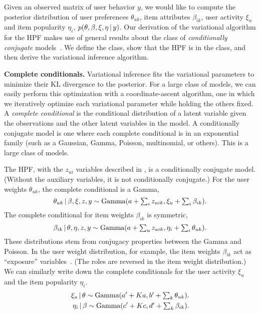 Given an observed matrix of user behavior $y$, we would like to
compute the posterior distribution of user preferences $\theta_{uk}$,
item attributes $\beta_{ik}$, user activity $\xi_u$ and item
popularity $\eta_i$, $p(\theta, \beta, \xi, \eta \,\vert\, y)$.  Our
derivation of the variational algorithm for the HPF makes use of
general results about the class of \textit{conditionally conjugate}
models~\cite{Ghahramani:2001,Hoffman:2013}.  We define the class, show
that the HPF is in the class, and then derive the variational
inference algorithm.

{\bf Complete conditionals.}  Variational inference fits the
variational parameters to minimize their KL divergence to the
posterior. For a large class of models, we can easily perform this
optimization with a coordinate-ascent algorithm, one in which we
iteratively optimize each variational parameter while holding the
others fixed.  A \textit{complete conditional} is the conditional
distribution of a latent variable given the observations and the other
latent variables in the model.  A conditionally conjugate model is one
where each complete conditional is in an exponential family (such as a
Gaussian, Gamma, Poisson, multinomial, or others).  This is a large
class of models.

The HPF, with the $z_{ui}$ variables described in ,
is a conditionally conjugate model.  (Without the auxiliary variables,
it is not conditionally conjugate.) For the user weights
$\theta_{uk}$, the complete conditional is a Gamma,
\begin{equation}
  \label{eq:user-weight-cc}
  \theta_{uk} \,\vert\, \beta, \xi, z, y \sim
  \textrm{Gamma}(a + \textstyle \sum_{i} z_{uik}, \xi_u + \sum_{i} \beta_{ik}).
\end{equation}
The complete conditional for item weights $\beta_{ik}$ is symmetric,
\begin{equation}
  \label{eq:item-weight-cc}
  \beta_{ik} \,\vert\, \theta, \eta, z, y \sim
  \textrm{Gamma}(a + \textstyle \sum_{u} z_{uik}, \eta_i + \sum_{i} \theta_{uk}).
\end{equation}
These distributions stem from conjugacy properties between the Gamma
and Poisson. In the user weight distribution, for example, the item
weights $\beta_{ik}$ act as ``exposure'' variables~\cite{Gelman:1995}.
(The roles are reversed in the item weight distribution.) We can
similarly write down the complete conditionals for the user activity
$\xi_u$ and the item popularity $\eta_i$.
\begin{align}
  \label{eq:user-weight-cc}
  \xi_{u} \,\vert\, \theta \sim
  \textrm{Gamma}(a' + \textstyle Ka, b' + \sum_{k} \theta_{uk}).\nonumber\\
  \eta_{i} \,\vert\, \beta \sim
  \textrm{Gamma}(c' + \textstyle Kc, d' + \sum_{k} \beta_{ik}).\nonumber\\
\end{align}

